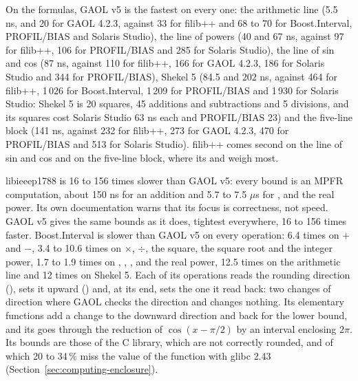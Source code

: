 \medskip
On the formulas, GAOL v5 is the fastest on every one: the arithmetic line
(5.5 ns, and 20 for GAOL 4.2.3, against 33 for filib++ and 68 to 70 for
Boost.Interval, PROFIL/BIAS and Solaris Studio), the line of powers (40 and
67 ns, against 97 for filib++, 106 for PROFIL/BIAS and 285 for Solaris
Studio), the line of sin and cos (87 ns, against 110 for filib++, 166 for
GAOL 4.2.3, 186 for Solaris Studio and 344 for PROFIL/BIAS), Shekel 5
(84.5 and 202 ns, against 464 for filib++, 1\,026 for Boost.Interval,
1\,209 for PROFIL/BIAS and 1\,930 for Solaris Studio: Shekel 5 is 20
squares, 45 additions and subtractions and 5 divisions, and its squares
cost Solaris Studio 63 ns each and PROFIL/BIAS 23) and the five-line block
(141 ns, against 232 for filib++, 273 for GAOL 4.2.3, 470 for PROFIL/BIAS
and 513 for Solaris Studio). filib++ comes second on the line of sin and
cos and on the five-line block, where its  and  weigh
most.

\medskip
libieeep1788 is 16 to 156 times slower than GAOL v5: every bound is an MPFR
computation, about 150 ns for an addition and 5.7 to 7.5 $\mu$s for ,
 and the real power. Its own documentation warns that its focus is
correctness, not speed. GAOL v5 gives the same bounds as it does, tightest
everywhere, 16 to 156 times faster. Boost.Interval is slower than GAOL v5 on
every operation: 6.4 times on $+$ and $-$, 3.4 to 10.6 times on $\times$,
$\div$, the square, the square root and the integer power, 1.7 to 1.9 times
on , , ,  and the real power, 12.5
times on the arithmetic line and 12 times on Shekel 5. Each of its
operations reads the rounding direction (), sets it upward
() and, at its end, sets the one it read back: two changes
of direction where GAOL checks the direction and changes nothing. Its
elementary functions add a change to the downward direction and back for the
lower bound, and its  goes through the reduction of
$\cos(x - \pi/2)$ by an interval enclosing $2\pi$. Its bounds are those of
the C library, which are not correctly rounded, and of which 20 to 34\,\%
miss the value of the function with glibc 2.43
(Section~\ref{sec:computing-enclosure}).

